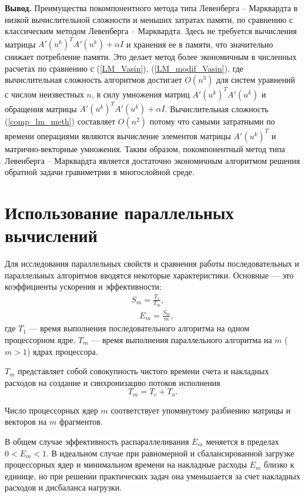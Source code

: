 {\bfseries\large Вывод.}
Преимущества покомпонентного метода типа Левенберга -- Марквардта в низкой вычислительной сложности и меньших затратах памяти, по сравнению с классическим методом Левенберга -- Марквардта. Здесь не требуется вычисления матрицы $A'(u^k)^T A'(u^k)+\alpha I$ и хранения ее в памяти, что значительно снижает потребление памяти. Это делает метод более экономичным в численных расчетах по сравнению с (\ref{LM_Vasin}), (\ref{LM_modif_Vasin}), где вычислительная сложность алгоритмов достигает $O(n^3)$ для систем уравнений с числом неизвестных $n$, в силу умножения матриц $A'(u^k)^T A'(u^k)$ и обращения матрицы $A'(u^k)^T A'(u^k)+\alpha I$. Вычислительная сложность (\ref{comp_lm_meth}) составляет $O(n^2)$ потому что самыми затратными по времени операциями являются вычисление элементов матрицы $A'(u^k)^T$ и матрично-векторные умножения. Таким образом, покомпонентный метод типа Левенберга -- Марквардта является достаточно экономичным алгоритмом решения обратной задачи гравиметрии в многослойной среде.

\newpage
\section{Использование параллельных вычислений}
Для исследования параллельных свойств и сравнения работы последовательных и параллельных алгоритмов вводятся некоторые характеристики. Основные --- это коэффициенты ускорения и эффективности:
\begin{equation}\nonumber
\begin{aligned}
S_m=\frac{T_1}{T_m},\\[16pt]
\quad E_m=\frac{S_m}{m},
\end{aligned}
\end{equation}
где 
$T_1$ --- время выполнения последовательного алгоритма на одном
процессорном ядре,
$T_m$ --- время выполнения параллельного алгоритма на $m$ ($m>1$) ядрах процессора.

$T_m$ представляет собой совокупность чистого времени счета 
и накладных расходов на создание и синхронизацию потоков исполнения $$T_m=T_c+T_o.$$

Число процессорных ядер $m$ соответствует упомянутому разбиению матрицы и векторов на $m$ фрагментов.

В общем случае эффективность распараллеливания $E_m$ меняется в пределах $0<E_m<1$. В идеальном случае при равномерной и сбалансированной загрузке процессорных ядер и минимальном времени на накладные расходы $E_m$ близко к единице, но при решении практических задач  она уменьшается за счет накладных расходов и дисбаланса нагрузки.

